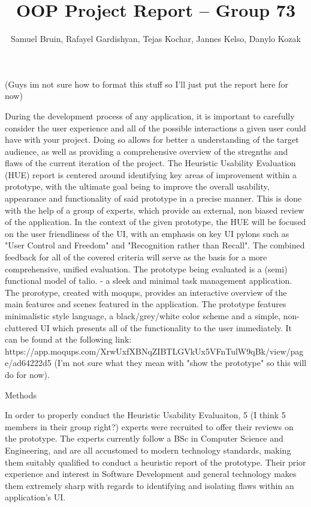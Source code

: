 \documentclass[sigconf]{acmart}
\title{OOP Project Report -- Group 73}
\author{Samuel Bruin, Rafayel Gardishyan, Tejas Kochar, Jannes Kelso, Danylo Kozak}
\begin{document}
\begin{abstract}

\end{abstract}

\maketitle

 (Guys im not sure how to format this stuff so I'll just put the report here for now)

    During the development process of any application, it is important to carefully consider the user experience and all of the possible interactions a given user could have with your project. Doing so allows for better a understanding of the target audience, as well as providing a comprehensive overview of the stregnths and flaws of the current iteration of the project. The Heuristic Usability Evaluation (HUE) report is centered around identifying key areas of improvement within a prototype, with the ultimate goal being to improve the overall usability, appearance and functionality of said prototype in a precise manner. This is done with the help of a group of experts, which provide an external, non biased review of the application. In the context of the given prototype, the HUE will be focused on the user friendliness of the UI, with an emphasis on key UI pylons such as "User Control and Freedom" and "Recognition rather than Recall". The combined feedback for all of the covered criteria will serve as the basis for a more comprehensive, unified evaluation. 
    The prototype being evaluated is a (semi) functional model of talio. - a sleek and minimal task management application. The prorotype, created with moqups, provides an interactive overview of the main features and scenes featured in the application. The prototype features minimalistic style language, a black/grey/white color scheme and a simple, non-cluttered UI which presents all of the functionality to the user immediately. It can be found at the following link: https://app.moqups.com/XrwUxfXBNqZIBTLGVkUx5VFnTulW9qBk/view/page/ad64222d5 (I'm not sure what they mean with "show the prototype" so this will do for now).

Methods

    In order to properly conduct the Heuristic Usability Evaluaiton, 5 (I think 5 members in their group right?) experts were recruited to offer their reviews on the prototype. The experts currently follow a BSc in Computer Science and Engineering, and are all accustomed to modern technology standards, making them suitably qualified to conduct a heuristic report of the prototype. Their prior experience and interest in Software Development and general technology makes them extremely sharp with regards to identifying and isolating flaws within an application's UI. 
\end{document}
